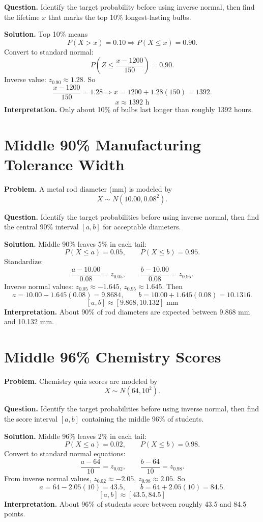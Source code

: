 \textbf{Question.} Identify the target probability before using inverse normal, then find the lifetime \(x\) that marks the top 10\% longest-lasting bulbs.

\textbf{Solution.}
Top 10\% means
\[
P(X>x)=0.10 \Rightarrow P(X\le x)=0.90.
\]
Convert to standard normal:
\[
P\!\left(Z\le \frac{x-1200}{150}\right)=0.90.
\]
Inverse value: \(z_{0.90}\approx 1.28\).
So
\[
\frac{x-1200}{150}=1.28 \Rightarrow x=1200+1.28(150)=1392.
\]
\[
\boxed{x\approx 1392\text{ h}}
\]
\textbf{Interpretation.} Only about 10\% of bulbs last longer than roughly 1392 hours.

\section{Middle 90\% Manufacturing Tolerance Width}

\textbf{Problem.}
A metal rod diameter (mm) is modeled by
\[
X \sim N(10.00, 0.08^2).
\]

\textbf{Question.} Identify the target probabilities before using inverse normal, then find the central 90\% interval \([a,b]\) for acceptable diameters.

\textbf{Solution.}
Middle 90\% leaves 5\% in each tail:
\[
P(X\le a)=0.05,\qquad P(X\le b)=0.95.
\]
Standardize:
\[
\frac{a-10.00}{0.08}=z_{0.05},\qquad \frac{b-10.00}{0.08}=z_{0.95}.
\]
Inverse normal values: \(z_{0.05}\approx -1.645\), \(z_{0.95}\approx 1.645\).
Then
\[
a=10.00-1.645(0.08)=9.8684,
\qquad
b=10.00+1.645(0.08)=10.1316.
\]
\[
\boxed{[a,b]\approx[9.868,10.132]\text{ mm}}
\]
\textbf{Interpretation.} About 90\% of rod diameters are expected between 9.868 mm and 10.132 mm.

\section{Middle 96\% Chemistry Scores}

\textbf{Problem.}
Chemistry quiz scores are modeled by
\[
X \sim N(64, 10^2).
\]

\textbf{Question.} Identify the target probabilities before using inverse normal, then find the score interval \([a,b]\) containing the middle 96\% of students.

\textbf{Solution.}
Middle 96\% leaves 2\% in each tail:
\[
P(X\le a)=0.02,\qquad P(X\le b)=0.98.
\]
Convert to standard normal equations:
\[
\frac{a-64}{10}=z_{0.02},\qquad \frac{b-64}{10}=z_{0.98}.
\]
From inverse normal values, \(z_{0.02}\approx -2.05\), \(z_{0.98}\approx 2.05\).
So
\[
a=64-2.05(10)=43.5,
\qquad
b=64+2.05(10)=84.5.
\]
\[
\boxed{[a,b]\approx[43.5,84.5]}
\]
\textbf{Interpretation.} About 96\% of students score between roughly 43.5 and 84.5 points.


